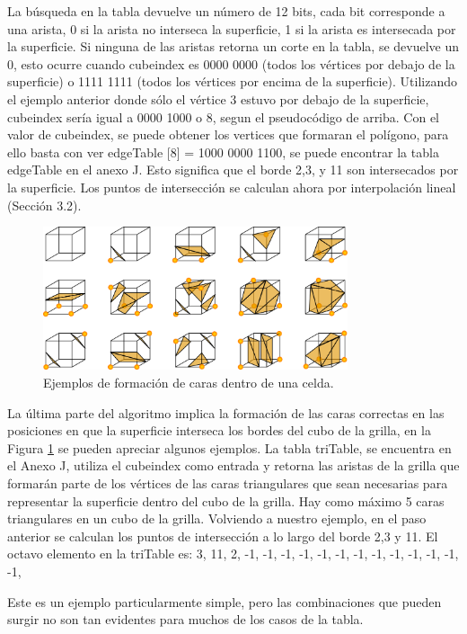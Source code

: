 \documentclass[12pt]{article}
\begin{document}
La búsqueda en la tabla devuelve un número de 12 bits, cada bit corresponde a una arista, 0 si la arista no interseca la superficie, 1 si la arista es intersecada por la superficie. Si ninguna de las aristas retorna un corte en la tabla, se devuelve un 0, esto ocurre cuando cubeindex es 0000 0000 (todos los vértices por debajo de la superficie) o 1111 1111 (todos los vértices por encima de la superficie).
Utilizando el ejemplo anterior donde sólo el vértice 3 estuvo por debajo de la superficie, cubeindex sería igual a 0000 1000 o 8, segun el pseudocódigo de arriba. Con el valor de cubeindex, se puede obtener los vertices que formaran el polígono, para ello basta con ver edgeTable [8] = 1000 0000 1100, se puede encontrar la tabla edgeTable en el anexo J. Esto significa que el borde 2,3, y 11 son intersecados por la superficie. Los puntos de intersección se calculan ahora por interpolación lineal (Sección 3.2).

\begin{figure}[h!]
\includegraphics[width=0.8\textwidth,center]{marchingcubes3.png}
\caption{Ejemplos de formación de caras dentro de una celda.}
\label{mc3}
\end{figure}

La última parte del algoritmo implica la formación de las caras correctas en las posiciones en que la superficie interseca los bordes del cubo de la grilla, en la Figura \ref{mc3} se pueden apreciar algunos ejemplos. La tabla triTable, se encuentra en el Anexo J, utiliza el cubeindex como entrada y retorna las aristas de la grilla que  formarán parte de los vértices de las caras triangulares que sean necesarias para representar la superficie dentro del cubo de la grilla. Hay como máximo 5 caras triangulares en un cubo de la grilla.
Volviendo a nuestro ejemplo, en el paso anterior se calculan los puntos de intersección a lo largo del borde 2,3 y 11. El octavo elemento en la triTable es:
{3, 11, 2, -1, -1, -1, -1, -1, -1, -1, -1, -1, -1, -1, -1, -1},

Este es un ejemplo particularmente simple, pero las combinaciones que pueden surgir no son tan evidentes para muchos de los casos de la tabla.
\end{document}
